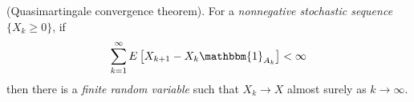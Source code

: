 \begin{enumerate}
\begin{equation*}
  \end{equation*}

  \begin{theorem}{(Quasimartingale convergence theorem).}
    For a \textit{nonnegative stochastic sequence} $\{X_{k} \ge 0\}$, if
    \begin{equation*}
      \sum_{k=1}^{\infty}E \left[X_{k+1}-X_{k}\mathbbm{1}_{A_{k}}\right] < \infty
    \end{equation*}
    then there is a \textit{finite random variable} such that $X_{k} \to X$ almost surely as $k \to \infty$.
  \end{theorem}
\end{enumerate}

